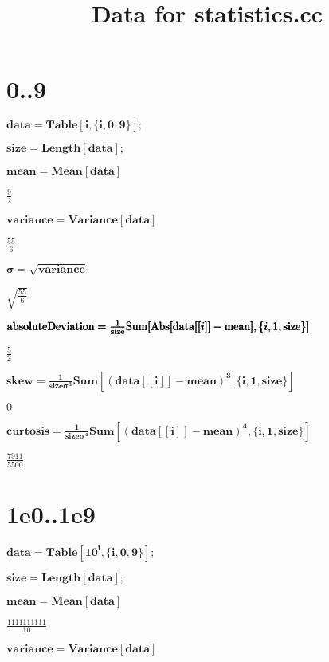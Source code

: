 \documentclass{article}
\begin{document}
\title{Data for statistics.cc}
\author{}
\date{}
\maketitle

\section*{0..9}

\noindent\(\pmb{\text{data}=\text{Table}[i,\{i,0,9\}];}\)

\noindent\(\pmb{\text{size}=\text{Length}[\text{data}];}\)

\noindent\(\pmb{\text{mean}=\text{Mean}[\text{data}]}\)

\noindent\(\frac{9}{2}\)

\noindent\(\pmb{\text{variance}=\text{Variance}[\text{data}]}\)

\noindent\(\frac{55}{6}\)

\noindent\(\pmb{\sigma =\sqrt{\text{variance}}}\)

\noindent\(\sqrt{\frac{55}{6}}\)

\noindent\(\pmb{\text{absoluteDeviation}=}\\
\pmb{\frac{1}{\text{size}}\text{Sum}[\text{Abs}[\text{data}[[i]]-\text{mean}],\{i,1,\text{size}\}]}\)

\noindent\(\frac{5}{2}\)

\noindent\(\pmb{\text{skew}=\frac{1}{\text{size} \sigma ^3}\text{Sum}\left[(\text{data}[[i]]-\text{mean})^3,\{i,1,\text{size}\}\right]}\)

\noindent\(0\)

\noindent\(\pmb{\text{curtosis}=\frac{1}{\text{size} \sigma ^4}\text{Sum}\left[(\text{data}[[i]]-\text{mean})^4,\{i,1,\text{size}\}\right]}\)

\noindent\(\frac{7911}{5500}\)

\section*{1e0..1e9}

\noindent\(\pmb{\text{data}=\text{Table}\left[10^i,\{i,0,9\}\right];}\)

\noindent\(\pmb{\text{size}=\text{Length}[\text{data}];}\)

\noindent\(\pmb{\text{mean}=\text{Mean}[\text{data}]}\)

\noindent\(\frac{1111111111}{10}\)

\noindent\(\pmb{\text{variance}=\text{Variance}[\text{data}]}\)
\end{document}
